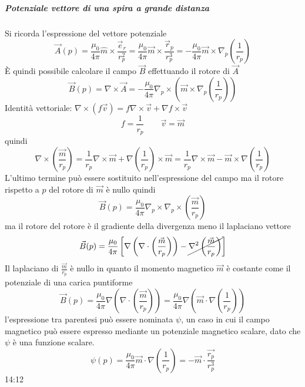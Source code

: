
\subparagraph{Potenziale vettore di una spira a grande distanza}
Si ricorda l'espressione del vettore potenziale
$$
\vec{A}(p) = \frac{\mu_0}{4\pi}\hat{m}\times\frac{\vec{e}_r}{r_p^2} = \frac{\mu_0}{4\pi}\vec{m}\times\frac{\vec{r}_p}{r_p^3} = -\frac{\mu_0}{4\pi}\vec{m}\times\nabla_p \left(\frac{1}{r_p} \right)
$$
È quindi possibile calcolare il campo $\vec{B}$ effettuando il rotore di $\vec{A}$
$$
\vec{B}(p) = \nabla\times\vec{A} = -\frac{\mu_0}{4\pi}\nabla_p\times\left(\vec{m}\times\nabla_p\left(\frac{1}{r_p}\right)\right)
$$
Identità vettoriale: $\nabla\times(f\vec{v}) = f\nabla\times\vec{v} + \nabla f \times \vec{v}$
$$
f = \frac{1}{r_p} \qquad \vec{v}=\vec{m}
$$
quindi
$$
\nabla\times\left(\frac{\vec{m}}{r_p}\right) = \frac{1}{r_p}\nabla\times\vec{m} + \nabla\left(\frac{1}{r_p}\right)\times \vec{m} = \frac{1}{r_p}\nabla\times\vec{m} - \vec{m}\times\nabla\left(\frac{1}{r_p}\right)
$$
L'ultimo termine può essere sostituito nell'espressione del campo ma il rotore rispetto
a $p$ del rotore di $\vec{m}$ è nullo quindi
$$
\vec{B}(p) = \frac{\mu_0}{4\pi} \nabla_p\times\nabla_p\times\left(\frac{\vec{m}}{r_p}\right)
$$
ma il rotore del rotore è il gradiente della divergenza meno il laplaciano vettore
$$
\vec{B}(p) = \frac{\mu_0}{4\pi} \left[\nabla\left(\nabla\cdot\left(\frac{\vec{m}}{r_p}\right)\right) - \cancel{\nabla^2\left(\frac{\vec{m}}{r_p}\right)}\right]
$$
Il laplaciano di $\frac{\vec{m}}{r_p}$ è nullo in quanto il momento magnetico $\vec{m}$ è 
costante come il potenziale di una carica puntiforme
$$
\vec{B}(p) = \frac{\mu_0}{4\pi}\nabla\left(\nabla\cdot\left(\frac{\vec{m}}{r_p}\right)\right) = \frac{\mu_0}{4\pi}\nabla\left(\vec{m}\cdot\nabla\left(\frac{1}{r_p}\right)\right)
$$
l'espressione tra parentesi può essere nominata $\psi$, un caso in cui il campo magnetico
può essere espresso mediante un potenziale magnetico scalare, dato che $\psi$ è una funzione 
scalare.
$$
\psi(p) = \frac{\mu_0}{4\pi}\vec{m}\cdot\nabla\left(\frac{1}{r_p}\right) = -\vec{m}\cdot \frac{\vec{r_p}}{r_p^3}
$$
14:12
